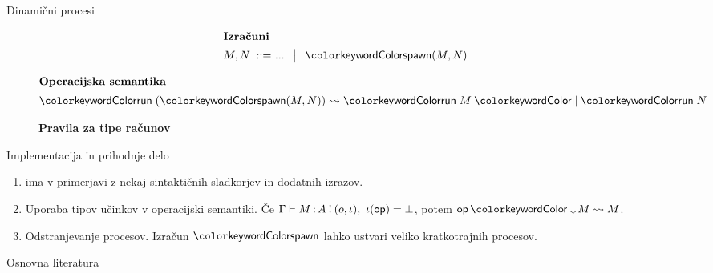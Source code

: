 \documentclass{beamer}
\theoremstyle{definition} %
\theoremstyle{plain} %
\begin{document}
	\begin{frame}{Dinamični procesi}
		
		\begin{figure}[hp]
			\parbox{\textwidth}{
				\centering
				\tiny
				\begin{align*}
				\shortintertext{\textbf{Izračuni}}
				M, N
				\bnfis & ... \,\bnfor\! \tmspawn{M}{N}
				\end{align*}
			} 
		\end{figure}
		
		\begin{figure}[tp]
			\centering
			\tiny
			\begin{align*}
			\shortintertext{\textbf{Operacijska semantika}}
			\tmrun{(\tmspawn{M}{N})} & \reduces \tmpar{\tmrun{M}}{\tmrun{N}}
			\end{align*}
		\end{figure}
	
	
		\begin{figure}[tp]
			\centering
			\tiny
			\textbf{Pravila za tipe računov}
			\begin{mathpar}
			\end{mathpar}
		\end{figure}
		
	\end{frame}
	
	
	
	
	\begin{frame}{Implementacija in prihodnje delo}
		\begin{enumerate}
			\item \aeff{} ima v primerjavi z \lae{} nekaj sintaktičnih sladkorjev in dodatnih izrazov.

			\item Uporaba tipov učinkov v operacijski semantiki. Če $\Gamma \vdash M \mathinner{:} A \mathbin{!} (o,\iota),\ \iota(\mathsf{op}) = \bot$, potem $\opincomp{\op}{M} \reduces M$.
			
			\item Odstranjevanje procesov. Izračun $\tmkw{spawn}$ lahko ustvari veliko kratkotrajnih procesov.
		\end{enumerate}
	\end{frame}
	
	
	
	
	\begin{frame}{Osnovna literatura}
				
		
		
	\end{frame}
	
	
\end{document}
